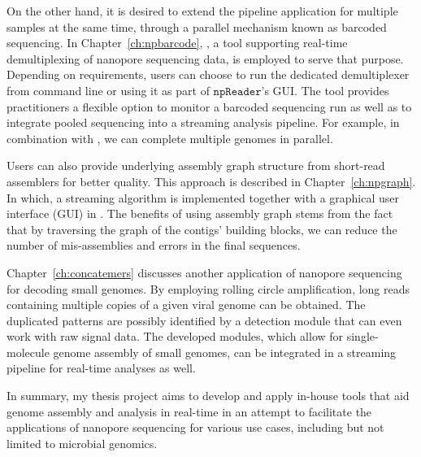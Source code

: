 On the other hand, it is desired to extend the pipeline application for multiple samples at the same time, through a parallel mechanism known as barcoded sequencing.
In Chapter~\ref{ch:npbarcode}, \npbarcode{}, a tool supporting real-time demultiplexing of nanopore sequencing data, is employed to serve that purpose. 
Depending on requirements, users can choose to run the dedicated demultiplexer from command line or using it as part of $\mathtt{npReader}$'s GUI. The tool provides practitioners a flexible option to monitor a barcoded sequencing run as well as to integrate pooled sequencing into a streaming analysis pipeline. For example, in combination with \npscarf{}, we can complete multiple genomes in parallel.

Users can also provide underlying assembly graph structure from short-read assemblers for better quality. This approach is described in Chapter~\ref{ch:npgraph}. In which, a streaming algorithm is implemented together with a graphical user interface (GUI) in \npgraph{}. The benefits of using assembly graph stems from the fact that by traversing the graph of the contigs' building blocks, we can reduce the number of mis-assemblies and errors in the final sequences. 

Chapter~\ref{ch:concatemers} discusses another application of nanopore sequencing for decoding small genomes. By employing rolling circle amplification, long reads containing multiple copies of a given viral genome can be obtained. The duplicated patterns are possibly identified by a detection module that can even work with raw signal data. The developed modules, which allow for single-molecule genome assembly of small genomes, can be integrated in a streaming pipeline for real-time analyses as well.

In summary, my thesis project aims to develop and apply in-house tools that aid genome assembly and analysis in real-time in an attempt to facilitate the applications of nanopore sequencing for various use cases, including but not limited to microbial genomics.
